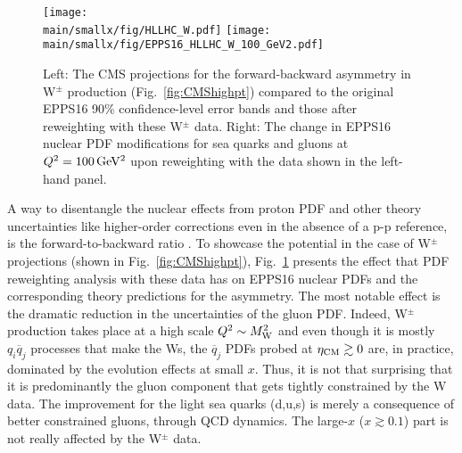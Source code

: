 \documentclass[../report.tex]{subfiles}
\providecommand{\main}{..}
\begin{document}



\begin{figure}[htb!]
\centering
\caption{Left: The CMS projections for the forward-backward asymmetry in W$^\pm$ production (Fig.~\ref{fig:CMShighpt}) compared to the original EPPS16 90\% confidence-level error bands and those after reweighting with these W$^\pm$ data. Right: The change in EPPS16 nuclear PDF modifications for sea quarks and gluons at $Q^2=100\,{\rm GeV^2}$ upon reweighting with the data shown in the left-hand panel.}
\texttt{[image: \\main/smallx/fig/HLLHC\_W.pdf]}
\texttt{[image: \\main/smallx/fig/EPPS16\_HLLHC\_W\_100\_GeV2.pdf]}
\label{fig:Wreweight}
\end{figure}

%
A way to disentangle the nuclear effects from proton PDF and other theory uncertainties like higher-order corrections even in the absence of a p-p reference, is the forward-to-backward ratio \cite{Paukkunen:2010qg}. To showcase the potential in the case of W$^\pm$ projections (shown in Fig.~\ref{fig:CMShighpt}), Fig.~\ref{fig:Wreweight} presents the effect that PDF reweighting \cite{Paukkunen:2014zia} analysis with these data has on EPPS16 nuclear PDFs and the corresponding theory predictions for the asymmetry. The most notable effect is the dramatic reduction in the uncertainties of the gluon PDF. Indeed, W$^\pm$ production takes place at a high scale $Q^2 \sim M_{\rm W}^2$ and even though it is mostly $q_i\overline{q}_j$ processes that make the Ws, the $\overline{q}_j$ PDFs probed at $\eta_{\rm CM} \gtrsim 0$ are, in practice, dominated by the evolution effects at small $x$. Thus, it is not that surprising that it is predominantly the gluon component that gets tightly constrained by the W data. The improvement for the light sea quarks (d,u,s) is merely a consequence of better constrained gluons, through QCD dynamics. The large-$x$ ($x \gtrsim 0.1$) part is not really affected by the  W$^\pm$ data. 
\end{document}
